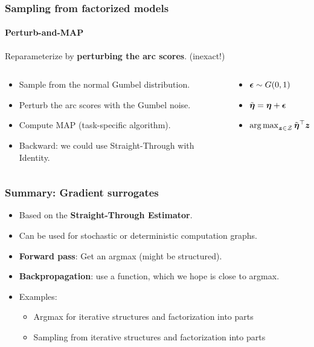 \begin{frame}%
\frametitle{Sampling from factorized models}%
\framesubtitle{Perturb-and-MAP}%
\centering
Reparameterize by \textbf{perturbing the arc scores}.
(inexact!)
\\[\baselineskip]
\begin{columns}[t]%
\begin{column}{.6\textwidth}%
\centering%
\begin{itemize}
    \item<2-> Sample from the normal Gumbel distribution.
    \item<3-> Perturb the arc scores with the Gumbel noise.
    \item<4-> Compute MAP (task-specific algorithm).
    \item<5-> Backward: we could use Straight-Through with Identity.
\end{itemize}
\end{column}
\begin{column}{.4\textwidth}%
\centering%
\begin{itemize}
    \item<2-> $\boldsymbol{\epsilon} \sim G(0,1)$
    \item<3-> $\tilde {\boldsymbol{\eta}} = \boldsymbol{\eta} + \boldsymbol{\epsilon}$
    \item<4-> $\operatorname*{arg\,max}_{\boldsymbol{z} \in \mathcal{Z}} \tilde {\boldsymbol{\eta}} ^\top \boldsymbol{z}$
\end{itemize}
\end{column}
\end{columns}
\end{frame}


\begin{frame}%
\frametitle{Summary: Gradient surrogates}%
\centering
\begin{itemize}
    \item Based on the \textbf{Straight-Through Estimator}.
    \item Can be used for stochastic or deterministic computation graphs.
    \item \textbf{Forward pass}: Get an argmax (might be structured).
    \item \textbf{Backpropagation}: use a function, which we hope is close to argmax.
    \item Examples:
        \begin{itemize}
            \item Argmax for iterative structures and factorization into parts
            \item Sampling from iterative structures and factorization into parts
        \end{itemize}
\end{itemize}
\end{frame}


